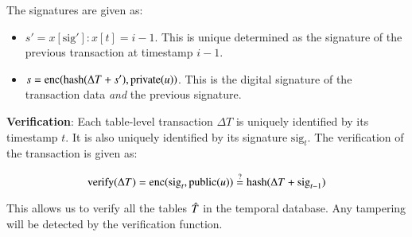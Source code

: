 The signatures are given as:

\begin{itemize}
    \item $s' = x[\mathrm{sig'}]: x[t] = i-1$. This is unique determined as the
        signature of the previous transaction at timestamp $i-1$.
    \item $s = \operatorname{enc}(\mathrm{hash}(\Delta T + s'), \operatorname{private}(u))$. This is the
        digital signature of the transaction data {\em and} the previous
        signature.
\end{itemize}

\medskip

{\bf Verification}: \quad Each table-level transaction $\Delta T$ is uniquely
identified by its timestamp $t$.  It is also uniquely identified by its
signature $\mathrm{sig}_t$.  The verification of the transaction is given as:

$$\mathrm{verify}(\Delta T) = \operatorname{enc}(\mathrm{sig}_t, \operatorname{public}(u)) 
    \overset{?}= \mathrm{hash}(\Delta T + \mathrm{sig}_{t-1}) $$

This allows us to verify all the tables $\Hat T$ in the temporal database.  Any
tampering will be detected by the verification function.


